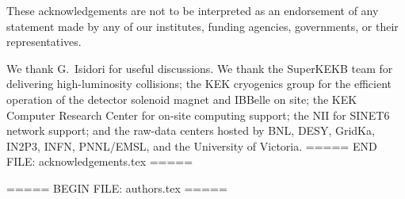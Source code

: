 These acknowledgements are not to be interpreted as an endorsement of any statement made
by any of our institutes, funding agencies, governments, or their representatives.

We thank G.~Isidori for useful discussions. We thank the SuperKEKB team for delivering high-luminosity collisions;
the KEK cryogenics group for the efficient operation of the detector solenoid magnet and IBBelle on site;
the KEK Computer Research Center for on-site computing support; the NII for SINET6 network support;
and the raw-data centers hosted by BNL, DESY, GridKa, IN2P3, INFN,
PNNL/EMSL,
and the University of Victoria.
===== END FILE: acknowledgements.tex =====

===== BEGIN FILE: authors.tex =====





  \author{M.~Abumusabh\,}
  \author{I.~Adachi\,}
  \author{K.~Adamczyk\,}
  \author{A.~Aggarwal\,}
  \author{L.~Aggarwal\,}

  \author{H.~Ahmed\,}

  \author{Y.~Ahn\,}
  \author{H.~Aihara\,}
  \author{N.~Akopov\,}
  \author{S.~Alghamdi\,}
  \author{M.~Alhakami\,}
  \author{A.~Aloisio\,}


  \author{N.~Althubiti\,}
  \author{K.~Amos\,}

  \author{M.~Angelsmark\,}
  \author{N.~Anh~Ky\,}
  \author{C.~Antonioli\,}
  \author{D.~M.~Asner\,}
  \author{H.~Atmacan\,}

  \author{T.~Aushev\,}


  \author{R.~Ayad\,}

  \author{V.~Babu\,}

  \author{H.~Bae\,}
  \author{N.~K.~Baghel\,}
  \author{S.~Bahinipati\,}

